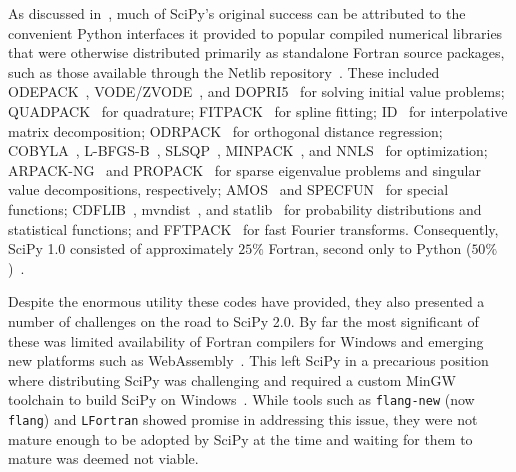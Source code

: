 \documentclass[acmsmall]{acmart}
\begin{document}
As discussed in~\cite{Virtanen2020}, much of SciPy's original success can be attributed
to the convenient Python interfaces it provided to popular compiled numerical libraries
that were otherwise distributed primarily as standalone Fortran source
packages, such as those available through the Netlib repository~\cite{Dongarra2008}.
These included
ODEPACK~\cite{Hindmarsh1983ODEPACK},
VODE/ZVODE~\cite{Brown1989}, and DOPRI5~\cite{Hairer1987} for solving initial value
problems; QUADPACK~\cite{Piessens1983} for quadrature; FITPACK~\cite{dierckx1995curve}
for spline fitting; ID~\cite{martinsson2008id,Halko2011} for interpolative
matrix decomposition; ODRPACK~\cite{Boggs1989}
for orthogonal distance regression; COBYLA~\cite{Powell1994}, L-BFGS-B~\cite{Morales2011},
SLSQP~\cite{Kraft1994,Kraft1988SQP}, MINPACK~\cite{More1980}, and
NNLS~\cite{Lawson1995} for optimization;
ARPACK-NG~\cite{Lehoucq2023ARPACKNG} and PROPACK~\cite{Larsen1998} for sparse eigenvalue problems
and singular value decompositions, respectively; AMOS~\cite{Amos1986} and
SPECFUN~\cite{Zhang1996} for special functions;
CDFLIB~\cite{Brown1994CDFLIB}, mvndist~\cite{Genz1992}, and
statlib~\cite{Dinneen1976,Best1975,Royston1995,Maclaren1985} for probability
distributions and statistical functions;
and FFTPACK~\cite{Swarztrauber1982} for fast Fourier transforms.
Consequently, SciPy 1.0 consisted of approximately $25\%$ Fortran,
second only to Python ($50\%$)~\cite{Virtanen2020}.

Despite the enormous utility these codes have provided, they also presented a number
of challenges on the road to SciPy 2.0. By far the most significant of these was
limited availability of Fortran compilers for Windows and
emerging new platforms such as WebAssembly~\cite{Haas2017}. This left SciPy
in a precarious position where distributing SciPy was challenging and required
a custom MinGW toolchain to build SciPy on Windows~\cite{obermeier2023eu}.
While tools such as \texttt{flang-new} (now \texttt{flang})
and \texttt{LFortran} showed promise in addressing this issue, they were not
mature enough to be adopted by SciPy at the time and waiting for them to mature was
deemed not viable.
\end{document}
